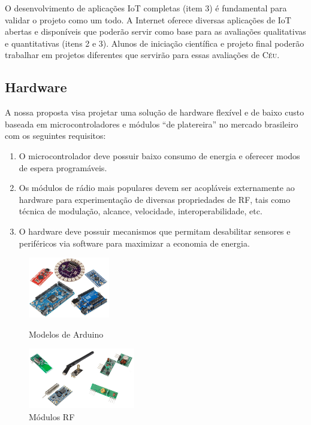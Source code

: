 \documentclass[titlepage,12pt]{article}
\newcommand{\CEU}{\textsc{C\'{e}u}\xspace}
\begin{document}
O desenvolvimento de aplicações IoT completas (item 3) é fundamental para
validar o projeto como um todo.
A Internet oferece diversas aplicações de IoT abertas e disponíveis que poderão
servir como base para as avaliações qualitativas e quantitativas (itens 2 e 3).
Alunos de iniciação científica e projeto final poderão trabalhar em projetos
diferentes que servirão para essas avaliações de \CEU.

\subsection{Hardware}

A nossa proposta visa projetar uma solução de hardware flexível e de baixo
custo baseada em microcontroladores e módulos ``de platereira'' no mercado
brasileiro com os seguintes requisitos:
%
\begin{enumerate}
\item O microcontrolador deve possuir baixo consumo de energia e oferecer
      modos de espera programáveis.
\item Os módulos de rádio mais populares devem ser acopláveis externamente ao
      hardware para experimentação de diversas propriedades de RF, tais como
      técnica de modulação, alcance, velocidade, interoperabilidade, etc.
\item O hardware deve possuir mecanismos que permitam desabilitar sensores e
      periféricos via software para maximizar a economia de energia.
\end{enumerate}

\begin{figure}
\begin{minipage}{0.50\textwidth}
\includegraphics[height=100px]{arduinos}
\caption{ Modelos de Arduino \label{fig.arduinos} }
\end{minipage}
\begin{minipage}{0.50\textwidth}
\includegraphics[height=100px]{rfs}
\caption{ Módulos RF \label{fig.rfs} }
\end{minipage}
\end{figure}
\end{document}

